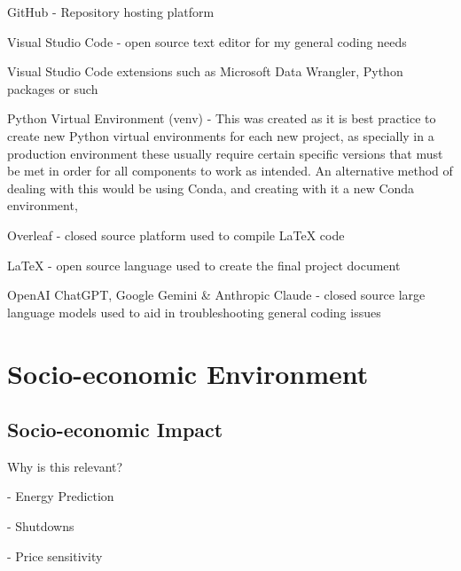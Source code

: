 \documentclass[12pt]{report} %
\begin{document}
GitHub - Repository hosting platform \cite{github}

Visual Studio Code - open source text editor for my general coding needs \cite{vscode}

Visual Studio Code extensions such as Microsoft Data Wrangler, Python packages or such

Python Virtual Environment (venv) - This was created as it is best practice to create new Python virtual environments for each new project, as specially in a production environment these usually require certain specific versions that must be met in order for all components to work as intended. An alternative method of dealing with this would be using Conda, and creating with it a new Conda environment, \cite{python_venv}

Overleaf - closed source platform used to compile LaTeX code \cite{overleaf}

LaTeX - open source language used to create the final project document \cite{latex}

OpenAI ChatGPT, Google Gemini \& Anthropic Claude - closed source large language models used to aid in troubleshooting general coding issues



\chapter{Socio-economic Environment}
\section{Socio-economic Impact}

Why is this relevant?

- Energy Prediction

- Shutdowns

- Price sensitivity

\end{document}
